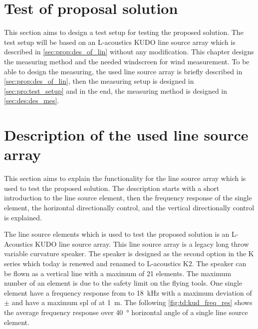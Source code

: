 \section{Test of proposal solution}
This section aims to design a test setup for testing the proposed solution. The test setup will be based on an L-acoustics KUDO line source array which is described in \autoref{sec:prop:des_of_lin} without any modification. This chapter designs the measuring method and the needed windscreen for wind measurement. To be able to design the measuring, the used line source array is briefly described in \autoref{sec:prop:des_of_lin}, then the measuring setup is designed in \autoref{sec:pro:test_setup} and in the end, the measuring method is designed in \autoref{sec:des:des_mes}.



\section{Description of the used line source array}\label{sec:prop:des_of_lin}

This section aims to explain the functionality for the line source array which is used to test the proposed solution. The description starts with a short introduction to the line source element, then the frequency response of the single element, the horizontal directionally control, and the vertical directionally control is explained.

The line source elements which is used to test the proposed solution is an L-Acoustics KUDO line source array. This line source array is a legacy long throw variable curvature speaker. The speaker is designed as the second option in the K series which today is renewed and renamed to L-acoustics K2. The speaker can be flown as a vertical line with a maximum of 21 elements. The maximum number of an element is due to the safety limit on the flying tools. 
One single element have a frequency response from  to \SI{18}{\kilo\hertz} with a maximum deviation of $\pm$  and have a maximum \gls{spl} of  at \SI{1}{\meter}. The following \autoref{fig:td:kud_freq_res} shows the average frequency response over \SI{40}{\degree} horizontal angle of a single line source element.



